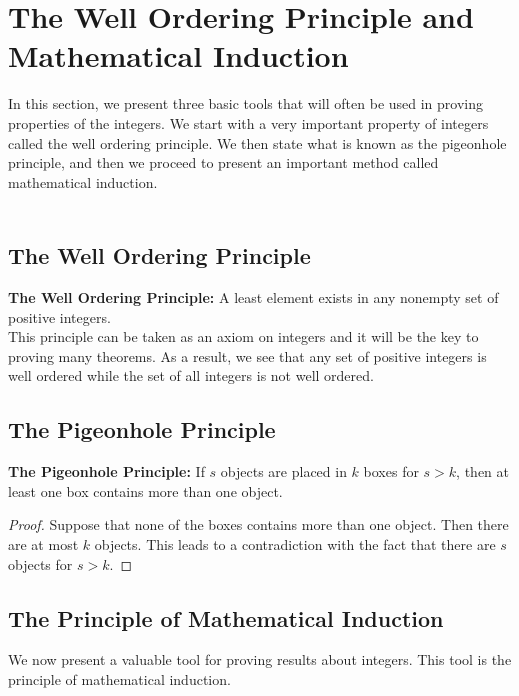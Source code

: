 \documentclass[12pt,letterpaper]{book}
\begin{document}
\newpage

\section{The Well Ordering Principle and Mathematical Induction}
In this section, we present three basic tools that will often be used in proving properties of the integers. We start with a very important property of
integers called the well ordering principle. We then state what is known as the pigeonhole principle, and then we proceed to present an
important method called mathematical induction. \\
\\
\subsection{\textbf{The Well Ordering Principle}}

\textbf{The Well Ordering Principle:}  A least element exists in any nonempty set of positive integers.\\

This principle can be taken as an axiom on integers and it will be
the key to proving many theorems.  As a result, we see that any set of
positive integers is well ordered while the set of all integers
is not well ordered.\\
\subsection{\textbf{The Pigeonhole Principle}}

\textbf{The Pigeonhole Principle:}  If
$s$ objects are placed in $k$ boxes for $s>k$, then at least one box
contains more than one object.

\begin{proof}
Suppose that none of the boxes contains more than one object.  Then
there are at most $k$ objects.  This leads to a contradiction with
the fact that there are $s$ objects for $s>k$.
\end{proof}

\subsection{\textbf{The Principle of Mathematical Induction}}

\par We now present a valuable tool for proving results about
integers.  This tool is the principle of mathematical induction.
\end{document}
